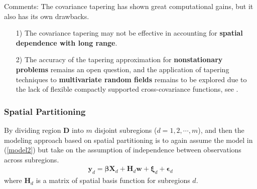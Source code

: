 \documentclass[
12pt, %
a4paper, %
oneside, %
headinclude,footinclude, %
BCOR5mm, %
]{scrartcl}
\begin{document}
\textcolor[rgb]{1.00,0.00,1.00}{Comments:}
The covariance tapering has shown great computational gains, but it also has its own drawbacks. 
\begin{itemize}
 \item [1)]The covariance tapering may not be effective in accounting for \textbf{spatial dependence with long range}.
 \item [2)]The accuracy of the tapering approximation for \textbf{nonstationary problems} remains an open question, and the application of tapering techniques to \textbf{multivariate random fields} remains to be explored due to the lack of flexible compactly supported cross-covariance functions, see \href{https://chenyw68.github.io/Literature/[2012]Advances and Challenges in Space-time Modelling of Natural Events.pdf}{\citet{porcu2012advances}}.
\end{itemize}
\subsubsection{Spatial Partitioning}
By dividing region $\boldsymbol{D}$ into $m$ disjoint subregions ($d = 1, 2, \cdots, m$),  and then the modeling approach based on spatial
partitioning is to again assume the model in (\ref{model2}) but take on the assumption of independence between observations across subregions. 
\begin{equation}
\begin{aligned}
\boldsymbol{y}_d = \boldsymbol{\beta}\boldsymbol{X}_d + \boldsymbol{H}_d\boldsymbol{w} + \boldsymbol{\xi}_d + \boldsymbol{\epsilon}_d
\end{aligned} \label{model2}
\end{equation}
where $\boldsymbol{H}_d$ is a matrix of spatial basis function for subregions $d$.
\end{document}
